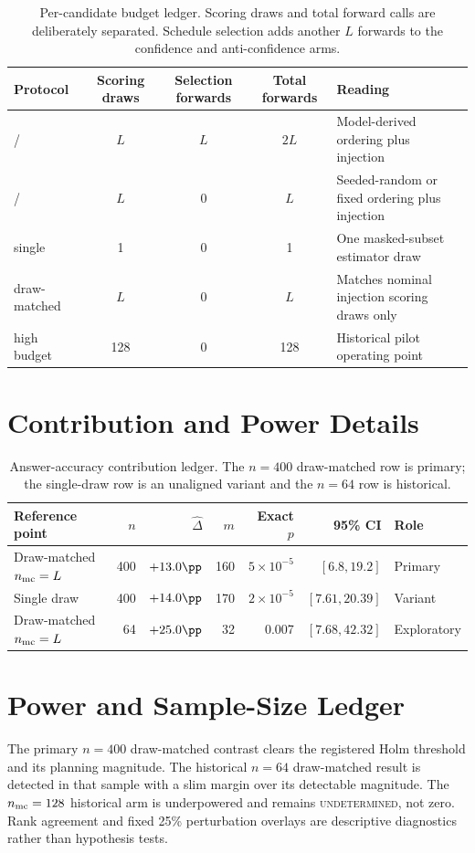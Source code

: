 \begin{table}[H]
\centering
\small
\caption{Per-candidate budget ledger.  Scoring draws and total forward calls
are deliberately separated.  Schedule selection adds another $L$ forwards to
the confidence and anti-confidence arms.}
\label{tab:compute-ledger}
\begin{tabularx}{\textwidth}{@{}p{}cccX@{}}
\toprule
Protocol & Scoring draws & Selection forwards & Total forwards & Reading \\
\midrule
\sconf{} / \ainj{} & $L$ & $L$ & $2L$ & Model-derived ordering plus injection \\
\rinj{} / \finj{} & $L$ & 0 & $L$ & Seeded-random or fixed ordering plus injection \\
\mcu{} single & 1 & 0 & 1 & One masked-subset estimator draw \\
\mcu{} draw-matched & $L$ & 0 & $L$ & Matches nominal injection scoring draws only \\
\mcu{} high budget & 128 & 0 & 128 & Historical pilot operating point \\
\bottomrule
\end{tabularx}
\end{table}

\section{Contribution and Power Details}
\label{app:contribceiling}

\begin{table}[H]
\centering
\small
\caption{Answer-accuracy contribution ledger.  The $n=400$ draw-matched row is
primary; the single-draw row is an unaligned variant and the $n=64$ row is
historical.}
\label{tab:compute-contrast}
\begin{tabular}{@{}lrrrrrl@{}}
\toprule
Reference point & $n$ & $\widehat\Delta$ & $m$ & Exact $p$ & 95\% CI & Role \\
\midrule
Draw-matched $n_{\rm mc}=L$ & 400 & $+13.0\pp$ & 160 & $5\times10^{-5}$ & $[6.8,19.2]$ & Primary \\
Single draw & 400 & $+14.0\pp$ & 170 & $2\times10^{-5}$ & $[7.61,20.39]$ & Variant \\
Draw-matched $n_{\rm mc}=L$ & 64 & $+25.0\pp$ & 32 & 0.007 & $[7.68,42.32]$ & Exploratory \\
\bottomrule
\end{tabular}
\end{table}

\section{Power and Sample-Size Ledger}
\label{app:powerledger}
The primary $n=400$ draw-matched contrast clears the registered Holm threshold
and its planning magnitude.  The historical $n=64$ draw-matched result is
detected in that sample with a slim margin over its detectable magnitude.  The
$n_{\rm mc}=128$ historical arm is underpowered and remains
\textsc{undetermined}, not zero.  Rank agreement and fixed 25\% perturbation
overlays are descriptive diagnostics rather than hypothesis tests.

